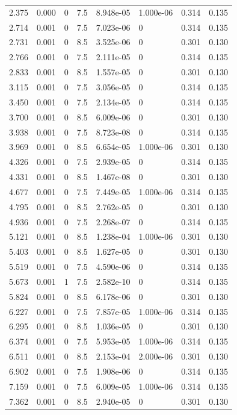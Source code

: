 \documentclass[preview]{standalone}
\begin{document}
{{\begin{tabular}{L{1.2cm}C{1.2cm} C{0.3cm}C{0.5cm} C{1.4cm}C{1.4cm} C{1.4cm}C{1.4cm}}
  2.375  &  0.000  & 0     & 7.5 &  8.948e-05  & 1.000e-06  & 0.314 &  0.135   \\ 
  2.714  &  0.001  & 0     & 7.5 &  7.023e-06  & 0  & 0.314 &  0.135   \\ 
  2.731  &  0.001  & 0     & 8.5 &  3.525e-06  & 0  & 0.301 &  0.130   \\ 
  2.766  &  0.001  & 0     & 7.5 &  2.111e-05  & 0  & 0.314 &  0.135   \\ 
  2.833  &  0.001  & 0     & 8.5 &  1.557e-05  & 0  & 0.301 &  0.130   \\ 
  3.115  &  0.001  & 0     & 7.5 &  3.056e-05  & 0  & 0.314 &  0.135   \\ 
  3.450  &  0.001  & 0     & 7.5 &  2.134e-05  & 0  & 0.314 &  0.135   \\ 
  3.700  &  0.001  & 0     & 8.5 &  6.009e-06  & 0  & 0.301 &  0.130   \\ 
  3.938  &  0.001  & 0     & 7.5 &  8.723e-08  & 0  & 0.314 &  0.135   \\ 
  3.969  &  0.001  & 0     & 8.5 &  6.654e-05  & 1.000e-06  & 0.301 &  0.130   \\ 
  4.326  &  0.001  & 0     & 7.5 &  2.939e-05  & 0  & 0.314 &  0.135   \\ 
  4.331  &  0.001  & 0     & 8.5 &  1.467e-08  & 0  & 0.301 &  0.130   \\ 
  4.677  &  0.001  & 0     & 7.5 &  7.449e-05  & 1.000e-06  & 0.314 &  0.135   \\ 
  4.795  &  0.001  & 0     & 8.5 &  2.762e-05  & 0  & 0.301 &  0.130   \\ 
  4.936  &  0.001  & 0     & 7.5 &  2.268e-07  & 0  & 0.314 &  0.135   \\ 
  5.121  &  0.001  & 0     & 8.5 &  1.238e-04  & 1.000e-06  & 0.301 &  0.130   \\ 
  5.403  &  0.001  & 0     & 8.5 &  1.627e-05  & 0  & 0.301 &  0.130   \\ 
  5.519  &  0.001  & 0     & 7.5 &  4.590e-06  & 0  & 0.314 &  0.135   \\ 
  5.673  &  0.001  & 1     & 7.5 &  2.582e-10  & 0  & 0.314 &  0.135   \\ 
  5.824  &  0.001  & 0     & 8.5 &  6.178e-06  & 0  & 0.301 &  0.130   \\ 
  6.227  &  0.001  & 0     & 7.5 &  7.857e-05  & 1.000e-06  & 0.314 &  0.135   \\ 
  6.295  &  0.001  & 0     & 8.5 &  1.036e-05  & 0  & 0.301 &  0.130   \\ 
  6.374  &  0.001  & 0     & 7.5 &  5.953e-05  & 1.000e-06  & 0.314 &  0.135   \\ 
  6.511  &  0.001  & 0     & 8.5 &  2.153e-04  & 2.000e-06  & 0.301 &  0.130   \\ 
  6.902  &  0.001  & 0     & 7.5 &  1.908e-06  & 0  & 0.314 &  0.135   \\ 
  7.159  &  0.001  & 0     & 7.5 &  6.009e-05  & 1.000e-06  & 0.314 &  0.135   \\ 
  7.362  &  0.001  & 0     & 8.5 &  2.940e-05  & 0  & 0.301 &  0.130   \\ 
\hline 
\end{tabular} 

}}
\end{document}
